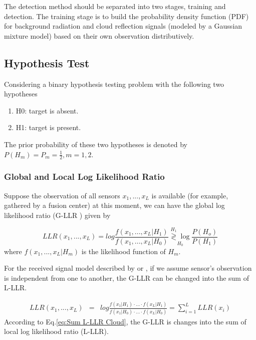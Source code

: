 The detection method should be separated into two stages, training
and detection. The training stage is to build the probability density
function (PDF) for background radiation and cloud reflection signals
(modeled by a Gaussian mixture model) based on their own observation
distributively.


\subsection{Hypothesis Test}

Considering a binary hypothesis testing problem with the following
two hypotheses
\begin{enumerate}
\item H0: target is absent.
\item H1: target is present.
\end{enumerate}
The prior probability of these two hypotheses is denoted by $P\left(H_{m}\right)=P_{m}=\frac{1}{2},m=1,2$.


\subsubsection{Global and Local Log Likelihood Ratio }

Suppose the observation of all sensors $x_{1},...,x_{L}$ is available
(for example, gathered by a fusion center) at this moment, we can
have the global log likelihood ratio (G-LLR ) given by

\begin{equation}
LLR(x_{1},...,x_{L})=log\frac{f\left(x_{1},...,x_{L}|H_{1}\right)}{f\left(x_{1},...,x_{L}|H_{0}\right)}\underset{H_{0}}{\overset{H_{1}}{\gtrless}\log}\frac{P\left(H_{o}\right)}{P\left(H_{1}\right)}\label{eq:G-LLR define Cloud}
\end{equation}
where $f\left(x_{1},...,x_{L}|H_{m}\right)$ is the likelihood function
of $H_{m}$. 

For the received signal model described by 
or , if we assume sensor\textquoteright{}s
observation is independent from one to another, the G-LLR can be changed
into the sum of L-LLR. 

\begin{eqnarray}
LLR(x_{1},...,x_{L}) & = & log\frac{f\left(x_{1}|H_{1}\right)\cdot\ldots\cdot f\left(x_{L}|H_{1}\right)}{f\left(x_{1}|H_{0}\right)\cdot\ldots\cdot f\left(x_{L}|H_{0}\right)}=\sum_{i=1}^{L}LLR\left(x_{i}\right)\label{eq:Sum L-LLR Cloud}
\end{eqnarray}
According to Eq.\ref{eq:Sum L-LLR Cloud}, the G-LLR is changes into
the sum of local log likelihood ratio (L-LLR). 


